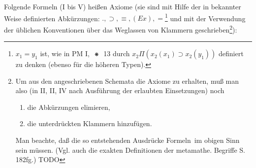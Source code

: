 \documentclass[draft]{scrartcl}
\begin{document}
Folgende Formeln (I bis V) heißen Axiome (sie 
sind mit Hilfe der in bekannter Weise definierten Abkürzungen:
$., \supset, \equiv, \left(Ex\right), =$\footnote{$x_1 = y_1$ ist, 
wie in PM I, $\pmstar$ 13 durch 
$x_2\Pi\left(x_2\left(x_1\right) \supset x_2\left(y_1\right)\right)$ 
definiert zu denken (ebenso für die höheren Typen).}
und mit der Verwendung der üblichen Konventionen über
das Weglassen von Klammern geschrieben\footnote{Um aus den
angeschriebenen Schemata die Axiome zu erhalten, 
muß man also (in II, II, IV nach Ausführung der erlaubten Einsetzungen) noch
\begin{enumerate}
\item die Abkürzungen elimieren,
\item die unterdrückten Klammern hinzufügen.
\end{enumerate}

Man beachte, daß die so entstehenden Ausdrücke \glqq Formeln\grqq\ im obigen Sinn sein müssen. (Vgl. auch die 
exakten Definitionen der metamathe. Begriffe S. 182fg.) TODO}):
\end{document}
